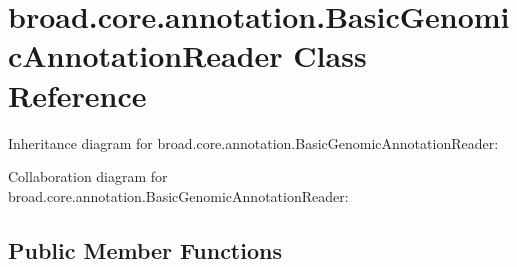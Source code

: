 \hypertarget{classbroad_1_1core_1_1annotation_1_1_basic_genomic_annotation_reader}{\section{broad.\+core.\+annotation.\+Basic\+Genomic\+Annotation\+Reader Class Reference}
\label{classbroad_1_1core_1_1annotation_1_1_basic_genomic_annotation_reader}
}


Inheritance diagram for broad.\+core.\+annotation.\+Basic\+Genomic\+Annotation\+Reader\+:


Collaboration diagram for broad.\+core.\+annotation.\+Basic\+Genomic\+Annotation\+Reader\+:
\subsection*{Public Member Functions}
